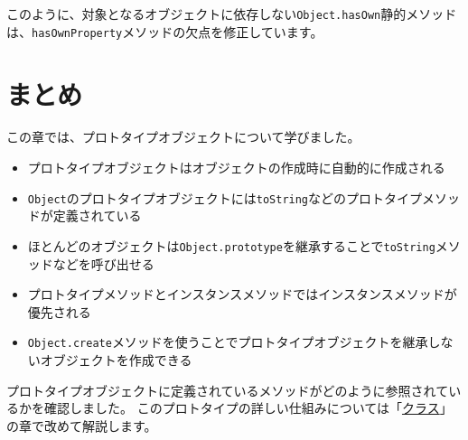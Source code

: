 このように、対象となるオブジェクトに依存しない\texttt{Object.hasOwn}静的メソッドは、\texttt{hasOwnProperty}メソッドの欠点を修正しています。

\hypertarget{conclusion}{%
\section{まとめ}\label{conclusion}}

この章では、プロトタイプオブジェクトについて学びました。

\begin{itemize}
\item
  プロトタイプオブジェクトはオブジェクトの作成時に自動的に作成される
\item
  \texttt{Object}のプロトタイプオブジェクトには\texttt{toString}などのプロトタイプメソッドが定義されている
\item
  ほとんどのオブジェクトは\texttt{Object.prototype}を継承することで\texttt{toString}メソッドなどを呼び出せる
\item
  プロトタイプメソッドとインスタンスメソッドではインスタンスメソッドが優先される
\item
  \texttt{Object.create}メソッドを使うことでプロトタイプオブジェクトを継承しないオブジェクトを作成できる
\end{itemize}

プロトタイプオブジェクトに定義されているメソッドがどのように参照されているかを確認しました。
このプロトタイプの詳しい仕組みについては「\hyperlink{class}{クラス}」の章で改めて解説します。
